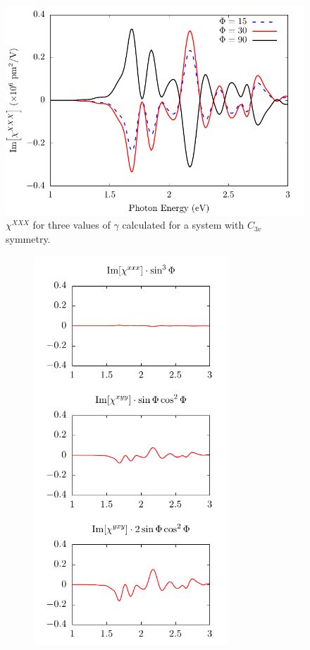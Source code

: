 \documentclass[aps,prb,10pt,letterpaper,notitlepage]{revtex4-1}
\begin{document}
\begin{figure}[t]
\centering
\includegraphics[width=0.4\linewidth]{rot/rotxxx.pdf}
\caption{$\chi^{XXX}$ for three values of $\gamma$ calculated for a system with
$C_{3v}$ symmetry.}
\label{fig:rotxxx}
\end{figure}

\begin{figure}[b]
    \centering
    \begin{subfigure}[b]{0.25\textwidth}
        \includegraphics[width=0.8\textwidth]{rot/comps15.pdf}

\end{subfigure}
\end{figure}
\end{document}
